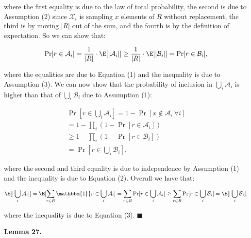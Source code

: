 \documentclass[10pt,a4paper]{article}
\begin{document}
where the first equality is due to the law of total probability, the second is due to Assumption (2) since $\mathcal{X}_{i}$ is sampling $x$ elements of $R$ without replacement, the third is by moving $|R|$ out of the sum, and the fourth is by the definition of expectation.
So we can show that:\par


\[\begin{gathered}
\displaystyle\Pr[r\in\mathcal{A}_{i}]=\frac{1}{|R|}\cdot\E[|\mathcal{A}_{i}|]\geq\frac{1}{|R|}\cdot\E[|\mathcal{B}_{i}|]=\Pr[r\in\mathcal{B}_{i}],
\end{gathered}\]


where the equalities are due to Equation (1) and the inequality is due to Assumption (3).
We can now show that the probability of inclusion in $\bigcup_{i}{\mathcal{A}_{i}}$ is higher than that of $\bigcup_{i}{\mathcal{B}_{i}}$ due to Assumption (1):\par


\[\begin{gathered}
\displaystyle\Pr[r\in\bigcup_{i}{\mathcal{A}_{i}}] \displaystyle=1-\Pr[x\notin\mathcal{A}_{i}\ \forall i] \\
\displaystyle=1-\prod_{i}{\left(1-\Pr[r\in\mathcal{A}_{i}]\right)} \\
\displaystyle\geq 1-\prod_{i}{\left(1-\Pr[r\in\mathcal{B}_{i}]\right)} \\
\displaystyle=\Pr[r\in\bigcup_{i}{\mathcal{B}_{i}}],
\end{gathered}\]


where the second and third equality is due to independence by Assumption (1) and the inequality is due to Equation (2).
Overall we have that:\par


\[\begin{gathered}
\displaystyle\E[|\bigcup_{i}{\mathcal{A}_{i}}|]=\E[\sum_{r\in R}{\mathbbm{1}\{r\in\bigcup_{i}{\mathcal{A}_{i}}}]=\sum_{r\in R}{\Pr[r\in\bigcup_{i}{\mathcal{A}_{i}}]}\geq\sum_{r\in R}{\Pr[r\in\bigcup_{i}{\mathcal{B}_{i}}]}=\E[|\bigcup_{i}{\mathcal{B}_{i}}],
\end{gathered}\]


where the inequality is due to Equation (3).
\ensuremath{\blacksquare}\par






\par\medskip\noindent\textbf{\textbf{Lemma 27}\textbf{.}}\par
\end{document}
